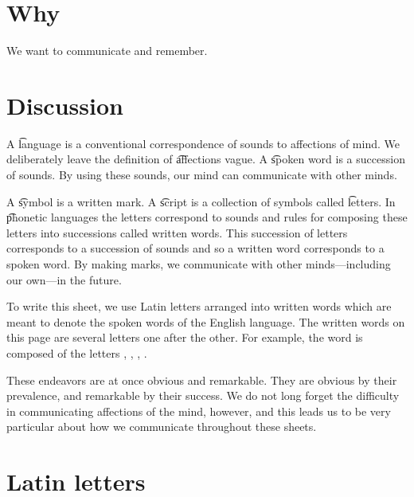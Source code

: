 
\section*{Why}

We want to communicate and remember.

\section*{Discussion}

A \t{language} is a conventional correspondence of sounds to affections of mind.
We deliberately leave the definition of \t{affections} vague.
A \t{spoken word} is a succession of sounds.
By using these sounds, our mind can communicate with other minds.

A \t{symbol} is a written mark.
A \t{script} is a collection of symbols called \t{letters}.
In \t{phonetic} languages the letters correspond to sounds and rules for composing these letters into successions called written words.
This succession of letters corresponds to a succession of sounds and so a written word corresponds to a spoken word.
By making marks, we communicate with other minds---including our own---in the future.

To write this sheet, we use Latin letters arranged into written words which are meant to denote the spoken words of the English language.
The written words on this page are several letters one after the other.
For example, the word  is composed of the letters , , , .

These endeavors are at once obvious and remarkable.
They are obvious by their prevalence, and remarkable by their success.
We do not long forget the difficulty in communicating affections of the mind, however, and this leads us to be very particular about how we communicate throughout these sheets.

\section*{Latin letters}

